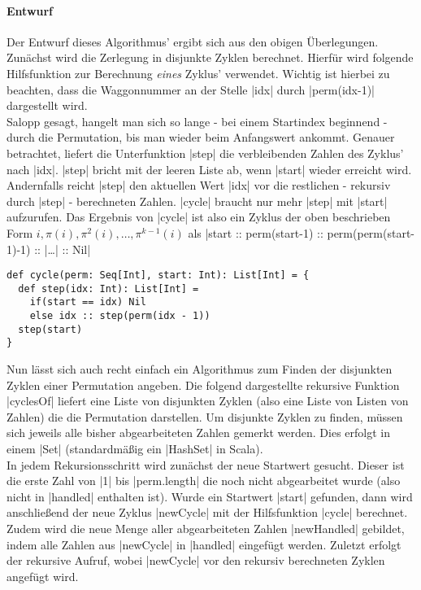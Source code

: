 \paragraph{Entwurf}
\label{slow_cycler}
Der Entwurf dieses Algorithmus' ergibt sich aus den obigen Überlegungen. Zunächst wird die Zerlegung in disjunkte Zyklen berechnet.
Hierfür wird folgende Hilfsfunktion zur Berechnung \emph{eines} Zyklus' verwendet.
Wichtig ist hierbei zu beachten, dass die Waggonnummer an der Stelle |idx| durch |perm(idx-1)| dargestellt wird.\\
Salopp gesagt, hangelt man sich so lange - bei einem Startindex beginnend - durch die Permutation, bis man wieder beim Anfangswert ankommt.
Genauer betrachtet, liefert die Unterfunktion |step| die verbleibenden Zahlen des Zyklus' nach |idx|.
|step| bricht mit der leeren Liste ab, wenn |start| wieder erreicht wird.
Andernfalls reicht |step| den aktuellen Wert |idx| vor die restlichen - rekursiv durch |step| - berechneten Zahlen.
|cycle| braucht nur mehr |step| mit |start| aufzurufen.
Das Ergebnis von |cycle| ist also ein Zyklus der oben beschrieben Form $i, \pi(i), \pi^2(i), \dots, \pi^{k-1}(i)$
als |start :: perm(start-1) :: perm(perm(start-1)-1) :: |\dots| :: Nil|
\lstset{language=Scala}
\lstset{basicstyle=\ttfamily\normalsize}
\begin{lstlisting}
def cycle(perm: Seq[Int], start: Int): List[Int] = {
  def step(idx: Int): List[Int] =
    if(start == idx) Nil
    else idx :: step(perm(idx - 1))
  step(start)
}
\end{lstlisting}
Nun lässt sich auch recht einfach ein Algorithmus zum Finden der disjunkten Zyklen einer Permutation angeben.
Die folgend dargestellte rekursive Funktion |cyclesOf| liefert eine Liste von disjunkten Zyklen (also eine Liste von Listen von Zahlen)
die die Permutation darstellen. Um disjunkte Zyklen zu finden, müssen sich jeweils alle bisher abgearbeiteten Zahlen gemerkt werden.
Dies erfolgt in einem |Set| (standardmäßig ein |HashSet| in Scala). \\
In jedem Rekursionsschritt wird zunächst der neue Startwert gesucht.
Dieser ist die erste Zahl von |1| bis |perm.length| die noch nicht abgearbeitet wurde (also nicht in |handled| enthalten ist).
Wurde ein Startwert |start| gefunden, dann wird anschließend der neue Zyklus |newCycle| mit der Hilfsfunktion |cycle| berechnet.
Zudem wird die neue Menge aller abgearbeiteten Zahlen |newHandled| gebildet, indem alle Zahlen aus |newCycle| in |handled| eingefügt werden.
Zuletzt erfolgt der rekursive Aufruf, wobei |newCycle| vor den rekursiv berechneten Zyklen angefügt wird.
